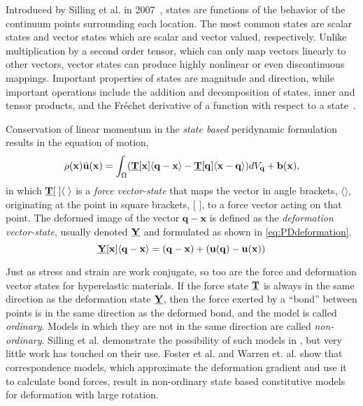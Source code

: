 \documentclass[11pt]{amsart}
\newcommand\vstate[3]{%
	\mathbf{\underline{#1}}%
	\ifstrempty{#2}{}{[#2]}%
	\ifstrempty{#3}{}{\langle #3 \rangle}}
\begin{document}
Introduced by Silling et al. in 2007~\cite{silling2007peridynamic}, states are functions of the behavior of the continuum points surrounding each location.
The most common states are scalar states and vector states which are scalar and vector valued, respectively.
Unlike multiplication by a second order tensor, which can only map vectors linearly to other vectors, vector states can produce highly nonlinear or even discontinuous mappings.
Important properties of states are magnitude and direction, while important operations include the addition and decomposition of states, inner and tensor products, and the Fr\'{e}chet derivative of a function with respect to a state~\cite{silling2007peridynamic}.

Conservation of linear momentum in the \textit{state based} peridynamic formulation results in the equation of motion,
%
\begin{equation}
\label{eq:PDstateEoM}
\rho(\mathbf{x})\ddot{\mathbf{u}}(\mathbf{x}) = \int_\Omega (\vstate{T}{\mathbf{x}}{\mathbf{q}-\mathbf{x}}-\vstate{T}{\mathbf{q}}{\mathbf{x}-\mathbf{q}}) dV_\mathbf{q}  + \mathbf{b}(\mathbf{x}),\notag
\end{equation}
%
in which $\vstate{T}{\;}{\;}$ is a \textit{force vector-state} that maps the vector in angle brackets, $\langle \rangle$, originating at the point in square brackets, [ ], to a force vector acting on that point.
The deformed image of the vector $\mathbf{q}-\mathbf{x}$ is defined as the \textit{deformation vector-state}, usually denoted $\vstate{Y}{}{}$ and formulated as shown in \cref{eq:PDdeformation}. 
%
\begin{equation}
\label{eq:PDdeformation}
\vstate{Y}{\mathbf{x}}{\mathbf{q}-\mathbf{x}} = (\mathbf{q}-\mathbf{x}) + (\mathbf{u}(\mathbf{q})-\mathbf{u}(\mathbf{x}))
\end{equation}
%

Just as stress and strain are work conjugate, so too are the force and deformation vector states for hyperelastic materials.
If the force state $\vstate{T}{}{}$ is always in the same direction as the deformation state $\vstate{Y}{}{}$, then the force exerted by a ``bond'' between points is in the same direction as the deformed bond, and the model is called \textit{ordinary}.  
Models in which they are not in the same direction are called \textit{non-ordinary}.
Silling et al. demonstrate the possibility of such models in \cite{silling2010peridynamic}, but very little work has touched on their use.
Foster et al. \cite{foster2010viscoplasticity} and Warren et. al. \cite{warren2009non} show that correspondence models, which approximate the deformation gradient and use it to calculate bond forces, result in non-ordinary state based constitutive models for deformation with large rotation.
%
\FloatBarrier
%
\end{document}
